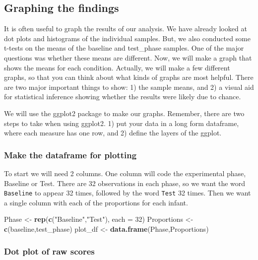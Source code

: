 \documentclass[]{book}
\newenvironment{Shaded}{\begin{snugshade}}{\end{snugshade}}
\newcommand{\KeywordTok}[1]{\textcolor[rgb]{0.13,0.29,0.53}{\textbf{{#1}}}}
\newcommand{\DataTypeTok}[1]{\textcolor[rgb]{0.13,0.29,0.53}{{#1}}}
\newcommand{\DecValTok}[1]{\textcolor[rgb]{0.00,0.00,0.81}{{#1}}}
\newcommand{\StringTok}[1]{\textcolor[rgb]{0.31,0.60,0.02}{{#1}}}
\newcommand{\NormalTok}[1]{{#1}}
\theoremstyle{definition}
\theoremstyle{definition}
\theoremstyle{definition}
\theoremstyle{remark}
\begin{document}
\subsection{Graphing the findings}\label{graphing-the-findings}

It is often useful to graph the results of our analysis. We have already
looked at dot plots and histograms of the individual samples. But, we
also conducted some t-tests on the means of the baseline and test\_phase
samples. One of the major questions was whether these means are
different. Now, we will make a graph that shows the means for each
condition. Actually, we will make a few different graphs, so that you
can think about what kinds of graphs are most helpful. There are two
major important things to show: 1) the sample means, and 2) a visual aid
for statistical inference showing whether the results were likely due to
chance.

We will use the ggplot2 package to make our graphs. Remember, there are
two steps to take when using ggplot2. 1) put your data in a long form
dataframe, where each measure has one row, and 2) define the layers of
the ggplot.

\subsubsection{Make the dataframe for
plotting}\label{make-the-dataframe-for-plotting}

To start we will need 2 columns. One column will code the experimental
phase, Baseline or Test. There are 32 observations in each phase, so we
want the word \texttt{Baseline} to appear 32 times, followed by the word
\texttt{Test} 32 times. Then we want a single column with each of the
proportions for each infant.

\begin{Shaded}
\begin{Highlighting}[]
\NormalTok{Phase <-}\StringTok{ }\KeywordTok{rep}\NormalTok{(}\KeywordTok{c}\NormalTok{(}\StringTok{"Baseline"}\NormalTok{,}\StringTok{"Test"}\NormalTok{), }\DataTypeTok{each =} \DecValTok{32}\NormalTok{)}
\NormalTok{Proportions <-}\StringTok{ }\KeywordTok{c}\NormalTok{(baseline,test_phase)}
\NormalTok{plot_df <-}\StringTok{ }\KeywordTok{data.frame}\NormalTok{(Phase,Proportions)}
\end{Highlighting}
\end{Shaded}

\subsubsection{Dot plot of raw scores}\label{dot-plot-of-raw-scores}
\end{document}
